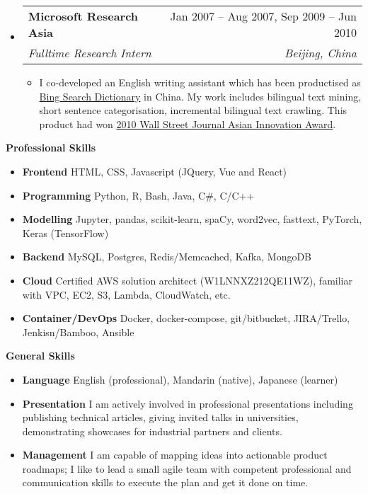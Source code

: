 \documentclass[letterpaper,12pt]{article}[leftmargin=*]
\makeatletter
\def \entryspacing {-0pt}
\renewcommand{\section}[2]{\vspace{5pt}
  \colorbox{secondary}{\color{white}\raggedbottom\normalsize\textbf{{#1}{\hspace{7pt}#2}}}
}
\newcommand{\resumeEntryStart}{\begin{itemize}[leftmargin=2.5mm]}
\newcommand{\resumeEntryEnd}{\end{itemize}\vspace{\entryspacing}}
\newcommand{\resumeItemListStart}{\begin{itemize}[leftmargin=4.5mm]}
\newcommand{\resumeItemListEnd}{\end{itemize}}
\newcommand{\resumeItem}[1]{
  \item\small{
    {#1 \vspace{-2pt}}
  }
}
\newcommand{\resumeEntryTSDL}[4]{
  \vspace{-1pt}\item[]
    \begin{tabularx}{0.97\textwidth}{X@{\hspace{60pt}}r}
      \textbf{\color{primary}#1} & {\firabook\color{accent}\small#2} \\
      \textit{\color{accent}\small#3} & \textit{\color{accent}\small#4} \\
    \end{tabularx}\vspace{-6pt}
}
\newcommand{\resumeEntryS}[2]{
  \item[]\small{
    \textbf{\color{primary}#1 }{ #2 \vspace{-6pt}}
  }
}
\makeatother
\begin{document}
  \resumeEntryStart
    \resumeEntryTSDL
      {Microsoft Research Asia}{Jan 2007 -- Aug 2007, Sep 2009 -- Jun 2010}
      {Fulltime Research Intern}{Beijing, China}
    \resumeItemListStart
      \resumeItem {I co-developed an English writing assistant which has been productised as \href{https://www.bing.com/dict?FORM=Z9LH3}{Bing Search Dictionary} in China. My work includes bilingual text mining, short sentence categorisation, incremental bilingual text crawling. This product had won \href{https://www.wsj.com/articles/SB10001424052748703545604575406771145298614}{2010 Wall Street Journal Asian Innovation Award}.}
    \resumeItemListEnd
  \resumeEntryEnd

\section{\faGears}{Professional Skills}
 \resumeEntryStart
  \resumeEntryS{Frontend} {HTML, CSS, Javascript (JQuery, Vue and React)}
  \resumeEntryS{Programming} {Python, R, Bash, Java, C\#, C/C++}
  \resumeEntryS{Modelling} {Jupyter, pandas, scikit-learn, spaCy, word2vec, fasttext, PyTorch, Keras (TensorFlow)}
  \resumeEntryS{Backend} {MySQL, Postgres, Redis/Memcached, Kafka, MongoDB}
  \resumeEntryS{Cloud} {Certified AWS solution architect (W1LNNXZ212QE11WZ), familiar with VPC, EC2, S3, Lambda, CloudWatch, etc.}
  \resumeEntryS{Container/DevOps} {Docker, docker-compose, git/bitbucket, JIRA/Trello, Jenkisn/Bamboo, Ansible}
 \resumeEntryEnd

\section{\faGears}{General Skills}
 \resumeEntryStart
  \resumeEntryS{Language} {English (professional), Mandarin (native), Japanese (learner)}
  \resumeEntryS{Presentation} {I am actively involved in professional presentations including publishing technical articles, giving
invited talks in universities, demonstrating showcases for industrial partners and clients.}
  \resumeEntryS{Management} {I am capable of mapping ideas into actionable product roadmaps; I like to lead a small agile team with competent professional and communication skills to execute the plan and get it done on time.}
 \resumeEntryEnd

\end{document}
